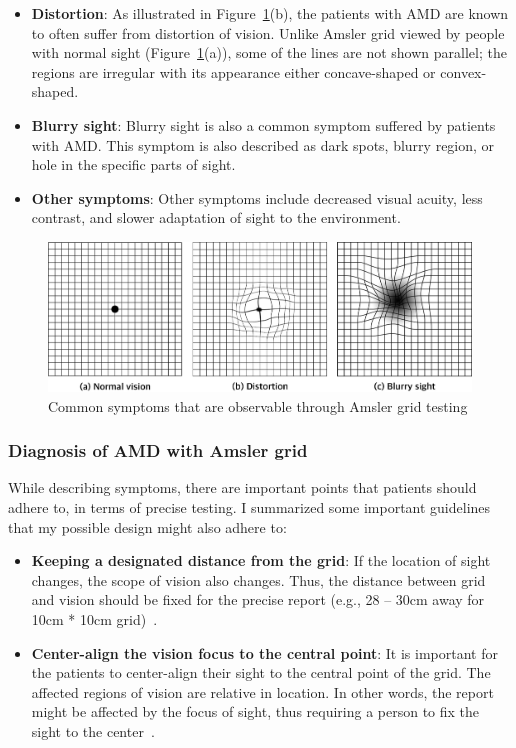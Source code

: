 \begin{itemize}
    \item \textbf{Distortion}: As illustrated in Figure~\ref{fig:symptoms}(b), the patients with AMD are known to often suffer from distortion of vision. Unlike Amsler grid viewed by people with normal sight (Figure~\ref{fig:symptoms}(a)), some of the lines are not shown parallel; the regions are irregular with its appearance either concave-shaped or convex-shaped.
    \item \textbf{Blurry sight}: Blurry sight is also a common symptom suffered by patients with AMD. This symptom is also described as dark spots, blurry region, or hole in the specific parts of sight.
    \item \textbf{Other symptoms}: Other symptoms include decreased visual acuity, less contrast, and slower adaptation of sight to the environment.
\end{itemize}

\begin{figure}[h!]
    \centering
    \includegraphics[width=\linewidth]{figure/symptoms.png}
    \caption{Common symptoms that are observable through Amsler grid testing}
    \label{fig:symptoms}
\end{figure}


\subsubsection{Diagnosis of AMD with Amsler grid}

While describing symptoms, there are important points that patients should adhere to, in terms of precise testing. I summarized some important guidelines that my possible design might also adhere to:

\begin{itemize}
    \item \textbf{Keeping a designated distance from the grid}: If the location of sight changes, the scope of vision also changes. Thus, the distance between grid and vision should be fixed for the precise report (e.g., 28 -- 30cm away for 10cm * 10cm grid)~\cite{elliott}.
    \item \textbf{Center-align the vision focus to the central point}: It is important for the patients to center-align their sight to the central point of the grid. The affected regions of vision are relative in location. In other words, the report might be affected by the focus of sight, thus requiring a person to fix the sight to the center~\cite{elliott}.
\end{itemize}

